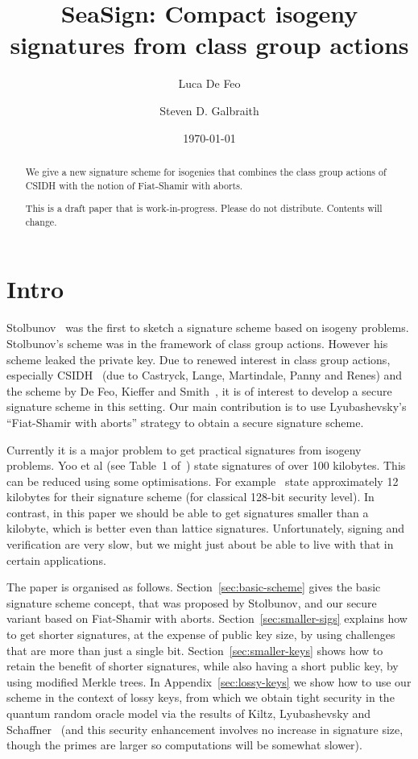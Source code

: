 \documentclass{llncs}
\title{SeaSign: Compact isogeny signatures from class group actions}
\author{Luca De Feo \and Steven D. Galbraith}
\institute{Mathematics Department, University of Auckland, NZ.
\email{s.galbraith@auckland.ac.nz}
\and
Paris, France.
\email{luca.de-feo@uvsq.fr}}
\date{\today}
\begin{document}
\pagestyle{plain}

\maketitle


\begin{abstract}
We give a new signature scheme for isogenies that combines the class group actions of CSIDH with the notion of Fiat-Shamir with aborts.

This is a draft paper that is work-in-progress. Please do not distribute. Contents will change.
\end{abstract}



\section{Intro}

Stolbunov~\cite{Sto12} was the first to sketch a signature scheme based on isogeny problems.
Stolbunov's scheme was in the framework of class group actions.
However his scheme leaked the private key.
Due to renewed interest in class group actions, especially CSIDH~\cite{CLMPR18} (due to Castryck, Lange, Martindale, Panny and Renes) and the scheme by De Feo, Kieffer and Smith~\cite{DFKS18}, it is of interest to develop a secure signature scheme in this setting.
Our main contribution is to use Lyubashevsky's ``Fiat-Shamir with aborts'' strategy to obtain a secure signature scheme.




Currently it is a major problem to get practical signatures from isogeny problems.
Yoo et al (see Table~1 of~\cite{YAJJS17}) state signatures of over 100 kilobytes.
This can be reduced using some optimisations. For example~\cite{GPS17} state approximately 12 kilobytes for their signature scheme (for classical 128-bit security level).
In contrast, in this paper we should be able to get signatures smaller than a kilobyte, which is better even than lattice signatures.
Unfortunately, signing and verification are very slow, but we might just about be able to live with that in certain applications.


The paper is organised as follows.
Section~\ref{sec:basic-scheme} gives the basic signature scheme concept, that was proposed by Stolbunov, and our secure variant based on Fiat-Shamir with aborts.
Section~\ref{sec:smaller-sigs} explains how to get shorter signatures, at the expense of public key size, by using challenges that are more than just a single bit.
Section~\ref{sec:smaller-keys} shows how to retain the benefit of shorter signatures, while also having a short public key, by using modified Merkle trees.
In Appendix~\ref{sec:lossy-keys} we show how to use our scheme in the context of lossy keys, from which we obtain tight security in the quantum random oracle model via the results of Kiltz, Lyubashevsky and Schaffner~\cite{KLS18} (and this security enhancement involves no increase in signature size, though the primes are larger so computations will be somewhat slower).
\end{document}
